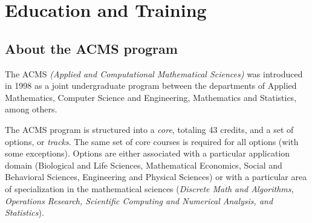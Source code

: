 \section{Education and Training}
\label{sec:education}
\subsection{\bf About the ACMS program}

The ACMS {\em (Applied and Computational Mathematical Sciences)} was
introduced in 1998 as a joint undergraduate program between the
departments of Applied Mathematics, Computer Science and Engineering,
Mathematics and Statistics, among others.

The ACMS program is structured into a {\em core}, totaling 43 credits,
and a set of options, or {\em tracks}. The same set of core courses is
required for all options (with some exceptions). Options are either
associated with a particular application domain (Biological and Life
Sciences, Mathematical Economics, Social and Behavioral Sciences,
Engineering and Physical Sciences) or with a particular area of
specialization in the mathematical sciences ({\em Discrete Math and
  Algorithms, Operations Research, Scientific Computing and Numerical
  Analysis, and Statistics}). 

